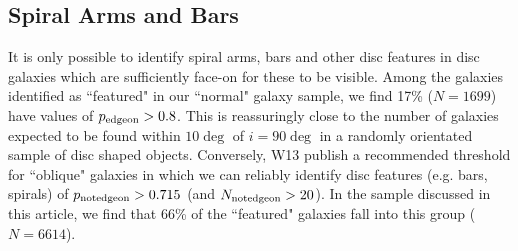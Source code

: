 \documentclass[usenatbib]{mn2e}
\newcommand{\comment}[2][todo]{{\color{#1}[[{\bf #2}]]}}
\begin{document}


\subsection{Spiral Arms and Bars}
 
  It is only possible to identify spiral arms, bars and other disc features in disc galaxies which are sufficiently face-on for these to be visible.  Among the galaxies identified as ``featured" in our ``normal" galaxy sample, we find {17\% ($N=1 699$)} have values of $p_{\rm edge on}>0.8$. This is reassuringly close to the number of galaxies expected to be found within $10\deg$ of $i=90\deg$ in a randomly orientated sample of disc shaped objects. %
Conversely, W13 publish a recommended threshold for ``oblique" galaxies in which we can reliably identify disc features (e.g. bars, spirals) of $p_{\rm not edge on}>0.715$ (and $N_{\rm not edge on}>20$). In the sample discussed in this article, we find that {66}\% of the ``featured" galaxies fall into this group {($N=6 614$)}. 
 
\end{document}
